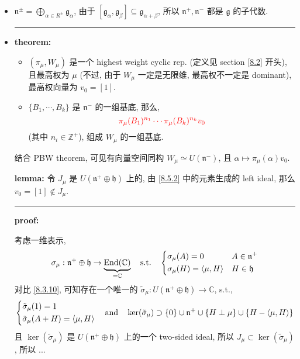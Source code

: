 \begin{itemize}
	\item $\mathfrak{n}^\pm = \bigoplus_{\alpha \in R^\pm} \mathfrak{g}_\alpha$, 由于 $[\mathfrak{g}_\alpha, \mathfrak{g}_\beta] \subseteq \mathfrak{g}_{\alpha + \beta}$, 所以 $\mathfrak{n}^+, \mathfrak{n}^-$ 都是 $\mathfrak{g}$ 的子代数.
	
	\noindent\rule[0.5ex]{\linewidth}{0.5pt} %
	
	\item \textbf{theorem:}
	\begin{itemize}
		\item $(\pi_\mu, W_\mu)$ 是一个 highest weight cyclic rep. (定义见 section \ref{8.2} 开头), 且最高权为 $\mu$ (不过, 由于 $W_\mu$ 一定是无限维, 最高权不一定是 dominant), 最高权向量为 $v_0 = [1]$.
		
		\item $\{B_1, \cdots, B_k\}$ 是 $\mathfrak{n}^-$ 的一组基底, 那么,
		\begin{equation} \label{8.5.7}
			\mathcolor{red}{\pi_\mu(B_1)^{n_1} \cdots \pi_\mu(B_k)^{n_k} v_0}
		\end{equation}
		(其中 $n_i \in \mathbb{Z}^+$), 组成 $W_\mu$ 的一组基底.
	\end{itemize}
	结合 PBW theorem, 可见有向量空间同构 $W_\mu \simeq U(\mathfrak{n}^-)$, 且 $\alpha \mapsto \pi_\mu(\alpha) v_0$.
	
	\begin{tcolorbox}[title=proof:]
		\textbf{lemma:} 令 $J_\mu$ 是 $U(\mathfrak{n}^+ \oplus \mathfrak{h})$ 上的, 由 \eqref{8.5.2} 中的元素生成的 left ideal, 那么 $v_0 = [1] \notin J_\mu$.
		
		\noindent\rule[0.5ex]{\linewidth}{0.5pt} %
		
		\textbf{proof:}
		
		考虑一维表示,
		\begin{equation}
			\sigma_\mu : \mathfrak{n}^+ \oplus \mathfrak{h} \rightarrow \underbrace{\mathrm{End}(\mathbb{C})}_{= \mathbb{C}} \quad \text{s.t.} \quad \begin{dcases}
				\sigma_\mu(A) = 0 & A \in \mathfrak{n}^+ \\
				\sigma_\mu(H) = \braket{\mu, H} & H \in \mathfrak{h}
			\end{dcases}
		\end{equation}
		对比 \eqref{8.3.10}, 可知存在一个唯一的 $\tilde{\sigma}_\mu : U(\mathfrak{n}^+ \oplus \mathfrak{h}) \rightarrow \mathbb{C}$, s.t.,
		\begin{equation}
			\begin{dcases}
				\tilde{\sigma}_\mu(1) = 1 \\
				\tilde{\sigma}_\mu(A + H) = \braket{\mu, H}
			\end{dcases} \quad \text{and} \quad \ker(\tilde{\sigma}_\mu) \supset \{0\} \cup \mathfrak{n}^+ \cup \{H \perp \mu\} \cup \{H - \braket{\mu, H}\}
		\end{equation}
		且 $\ker(\tilde{\sigma}_\mu)$ 是 $U(\mathfrak{n}^+ \oplus \mathfrak{h})$ 上的一个 two-sided ideal, 所以 $J_\mu \subset \ker(\tilde{\sigma}_\mu)$, 所以 ...
		

\end{tcolorbox}
\end{itemize}
